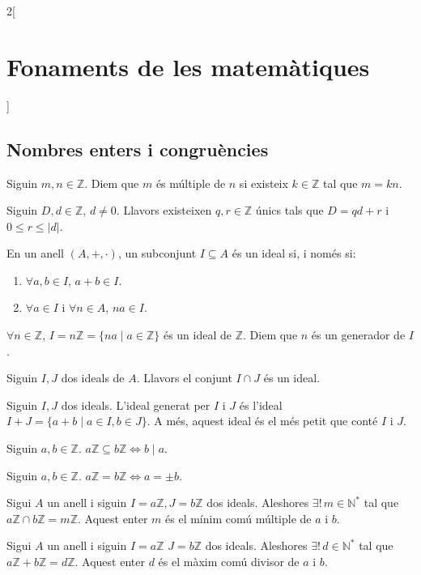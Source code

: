 \documentclass[class=article,10pt,crop=false]{standalone}
\begin{document}
\begin{multicols}{2}[\section{Fonaments de les matemàtiques}]
\subsection{Nombres enters i congruències}
\begin{definition}
Siguin $m,n\in\mathbb{Z}$. Diem que $m$ és múltiple de $n$ si existeix $k\in\mathbb{Z}$ tal que $m=kn$.
\end{definition}
\begin{theorem}
Siguin $D,d\in\mathbb{Z}$, $d\ne 0$. Llavors existeixen $q,r\in\mathbb{Z}$ únics tals que $D=qd+r$ i $0\leq r\leq|d|$.
\end{theorem}
\begin{definition}
En un anell $(A,+,\cdot)$, un subconjunt $I\subseteq A$ és un ideal si, i només si:
\begin{enumerate}
    \item $\forall a,b\in I$, $a+b\in I$.
    \item $\forall a\in I$ i $\forall n\in A$, $na\in I$.
\end{enumerate}
\end{definition}
\begin{lemma}
$\forall n\in\mathbb{Z}$, $I=n\mathbb{Z}=\{na\mid a\in\mathbb{Z}\}$ és un ideal de $\mathbb{Z}$. Diem que $n$ és un generador de $I$.
\end{lemma}
\begin{lemma}
Siguin $I,J$ dos ideals de $A$. Llavors el conjunt $I\cap J$ és un ideal.
\end{lemma}
\begin{lemma}
Siguin $I,J$ dos ideals. L'ideal generat per $I$ i $J$ és l'ideal $I+J=\{a+b\mid a\in I,b\in J\}$. A més, aquest ideal és el més petit que conté $I$ i $J$.
\end{lemma}
\begin{prop}
Siguin $a,b\in \mathbb{Z}$. $a\mathbb{Z}\subseteq b\mathbb{Z}\iff b\mid a$.
\end{prop}
\begin{corollary}
Siguin $a,b\in \mathbb{Z}$. $a\mathbb{Z}=b\mathbb{Z}\iff a=\pm b$.
\end{corollary}
\begin{prop}
Sigui $A$ un anell i siguin $I=a\mathbb{Z},J=b\mathbb{Z}$ dos ideals. Aleshores $\exists!\,m\in\mathbb{N}^*$ tal que $a\mathbb{Z}\cap b\mathbb{Z}=m\mathbb{Z}$. Aquest enter $m$ és el mínim comú múltiple de $a$ i $b$.
\end{prop}
\begin{prop}
Sigui $A$ un anell i siguin $I=a\mathbb{Z}$ $J=b\mathbb{Z}$ dos ideals. Aleshores $\exists!\,d\in\mathbb{N}^*$ tal que $a\mathbb{Z}+b\mathbb{Z}=d\mathbb{Z}$. Aquest enter $d$ és el màxim comú divisor de $a$ i $b$.

\end{prop}
\end{multicols}
\end{document}
